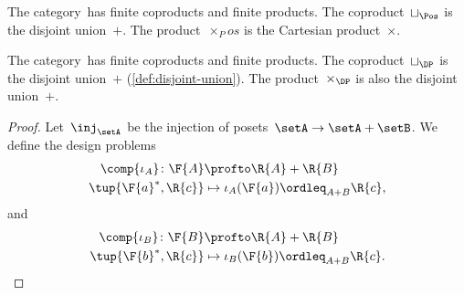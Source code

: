 \begin{example}
    The category~\Pos has finite coproducts and finite products.
    The coproduct~$\sqcup_\Pos$ is the disjoint union~$+$.
    The product~$\times_Pos$ is the Cartesian product~$\times$.
\end{example}

\begin{lemma}
    The category~\DP has finite coproducts and finite products.
    The coproduct~$\sqcup_\DP$ is the disjoint union~$+$ (\cref{def:disjoint-union}).
    The product~$\times_\DP$ is also the disjoint union~$+$.
\end{lemma}

\begin{proof}
    Let~$\inj_\setA$ be the injection of posets~$\setA \to \setA+\setB$.
    We define the design problems
    \begin{equation}
        \begin{aligned}
            \comp{\iota_A} \colon \F{A} & \profto \R{A} + \R{B}                     \\
            \tup{\F{a}^*,\R{c}}         & \mapsto \iota_A(\F{a})\ordleq_{A+B}\R{c},
        \end{aligned}
    \end{equation}
    and
    \begin{equation}
        \begin{aligned}
            \comp{\iota_B} \colon \F{B} & \profto \R{A} + \R{B}                     \\
            \tup{\F{b}^*,\R{c}}         & \mapsto \iota_B(\F{b})\ordleq_{A+B}\R{c}.
        \end{aligned}
    \end{equation}


\end{proof}
